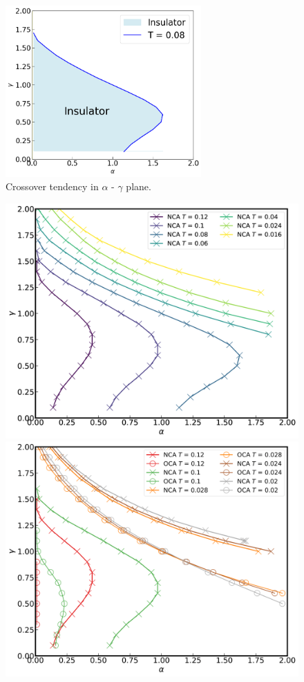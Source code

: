 \documentclass{article}[12pt]
\begin{document}
\begin{spacing}{1.5}
\begin{figure}[H]
  \centerline{\includegraphics[width=7.5cm]{TexFigure/4_3_07_Simplefig.png}}
  \caption{Crossover tendency in $\alpha$ - $\gamma$ plane.}
\end{figure}
\pagebreak
\newpage
\begin{figure}[H]
  \centerline{\includegraphics[width=12cm]{TexFigure/4_3_08_3dplot_Ns3_proj_n-1.png}}
  \centerline{\includegraphics[width=12cm]{TexFigure/4_3_09_3dplot_COMP3_proj_n-1.png}}

\end{figure}
\end{spacing}
\end{document}
